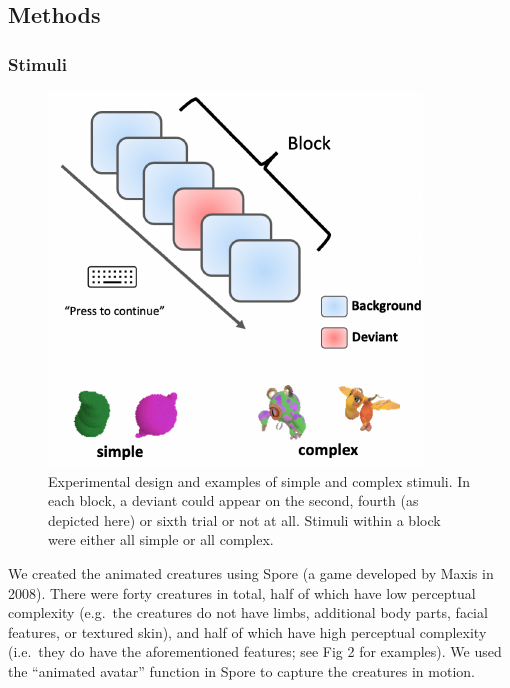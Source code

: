 \documentclass[10pt, letterpaper]{article}
\newenvironment{CodeChunk}{}{}
\begin{document}
\hypertarget{methods}{%
\subsection{Methods}\label{methods}}

\hypertarget{stimuli}{%
\subsubsection{Stimuli}\label{stimuli}}

\begin{CodeChunk}
\begin{figure}[h]

{\centering \includegraphics{figs/experimental_design-1} 

}

\caption[Experimental design and examples of simple and complex stimuli]{Experimental design and examples of simple and complex stimuli. In each block, a deviant could appear on the second, fourth (as depicted here) or sixth trial or not at all. Stimuli within a block were either all simple or all complex.}\label{fig:experimental_design}
\end{figure}
\end{CodeChunk}

We created the animated creatures using Spore (a game developed by Maxis
in 2008). There were forty creatures in total, half of which have low
perceptual complexity (e.g.~the creatures do not have limbs, additional
body parts, facial features, or textured skin), and half of which have
high perceptual complexity (i.e.~they do have the aforementioned
features; see Fig 2 for examples). We used the ``animated avatar''
function in Spore to capture the creatures in motion.
\end{document}
